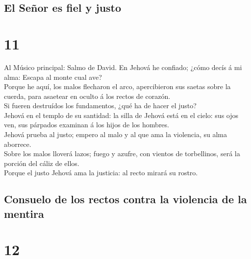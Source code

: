 \hypertarget{el-seuxf1or-es-fiel-y-justo}{%
\subsection{El Señor es fiel y
justo}\label{el-seuxf1or-es-fiel-y-justo}}

\hypertarget{section-10}{%
\section{11}\label{section-10}}

 Al Músico principal: Salmo de David. En Jehová he
confiado; ¿cómo decís á mi alma: Escapa al monte cual ave?\\
 Porque he aquí, los malos flecharon el arco, apercibieron
sus saetas sobre la cuerda, para asaetear en oculto á los rectos de
corazón.\\
 Si fueren destruídos los fundamentos, ¿qué ha de hacer el
justo?\\
 Jehová en el templo de su santidad: la silla de Jehová
está en el cielo: sus ojos ven, sus párpados examinan á los hijos de los
hombres.\\
 Jehová prueba al justo; empero al malo y al que ama la
violencia, su alma aborrece.\\
 Sobre los malos lloverá lazos; fuego y azufre, con
vientos de torbellinos, será la porción del cáliz de ellos.\\
 Porque el justo Jehová ama la justicia: al recto mirará
su rostro.

\hypertarget{consuelo-de-los-rectos-contra-la-violencia-de-la-mentira}{%
\subsection{Consuelo de los rectos contra la violencia de la
mentira}\label{consuelo-de-los-rectos-contra-la-violencia-de-la-mentira}}

\hypertarget{section-11}{%
\section{12}\label{section-11}}

